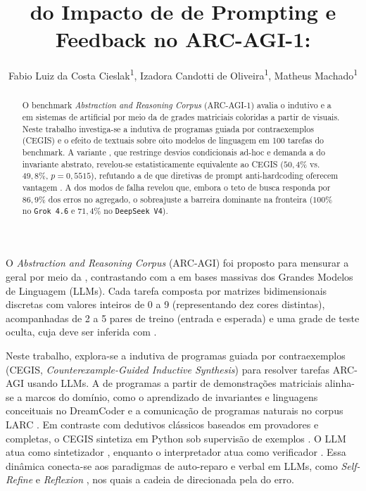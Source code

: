 \documentclass[letterpaper]{article} %
\title{\Analise{} do Impacto de \Variacoes{} de Prompting e Feedback \Semantico{} no ARC-AGI-1: \Fundamentacao{} \Estatistica{}}
\author{
    Fabio Luiz da Costa Cieslak\equalcontrib\textsuperscript{1},
    Izadora Candotti de Oliveira\equalcontrib\textsuperscript{1},
    Matheus Machado\equalcontrib\textsuperscript{1}
}
\begin{document}
\maketitle

\begin{abstract}
O benchmark \textit{Abstraction and Reasoning Corpus} (ARC-AGI-1) avalia o \raciocinio{} indutivo e a \generalizacao{} em sistemas de \inteligencia{} artificial por meio da \transformacao{} de grades matriciais coloridas a partir de \demonstracoes{} visuais. Neste trabalho investiga-se a \sintese{} indutiva de programas guiada por contraexemplos (CEGIS) e o efeito de \restricoes{} textuais \AntiTrapaca{} sobre oito modelos de linguagem em 100 tarefas do benchmark. A variante \AntiTrapaca{}, que restringe desvios condicionais ad-hoc e demanda a \declaracao{} \previa{} do invariante abstrato, revelou-se estatisticamente equivalente ao CEGIS \padrao{} ($50{,}4\%$ vs.\ $49{,}8\%$, $p = 0{,}5515$), refutando a \hipotese{} de que diretivas de prompt anti-hardcoding oferecem vantagem \generalizavel{}. A \analise{} dos modos de falha revelou que, embora o teto de busca responda por $86{,}9\%$ dos erros no agregado, o sobreajuste \espurio{} \e{} a barreira dominante na fronteira ($100\%$ no \texttt{Grok 4.6} e $71{,}4\%$ no \texttt{DeepSeek V4}).
\end{abstract}

\section{\Introducao{}}
O \textit{Abstraction and Reasoning Corpus} (ARC-AGI) \cite{chollet2019measure} foi proposto para mensurar a \inteligencia{} geral por meio da \inducao{}, contrastando com a \memorizacao{} em bases massivas \caracteristica{} dos Grandes Modelos de Linguagem (LLMs). Cada tarefa \e{} composta por matrizes bidimensionais discretas com valores inteiros de 0 a 9 (representando dez cores distintas), acompanhadas de 2 a 5 pares de treino (entrada e \saida{} esperada) e uma grade de teste oculta, cuja \transformacao{} deve ser inferida com \exatidao{}.

Neste trabalho, explora-se a \sintese{} indutiva de programas guiada por contraexemplos (CEGIS, \textit{Counterexample-Guided Inductive Synthesis}) \cite{solar2008program} para resolver tarefas ARC-AGI usando LLMs. A \inducao{} de programas a partir de demonstra{\c{c}}{\~o}es matriciais alinha-se a marcos do dom{\'{i}}nio, como o aprendizado de invariantes e linguagens conceituais no DreamCoder \cite{ellis2021dreamcoder} e a comunica{\c{c}}{\~a}o de programas naturais no corpus LARC \cite{larc2022acquaviva}. Em contraste com \metodos{} dedutivos cl{\'{a}}ssicos baseados em provadores \logicos{} e \especificacoes{} completas, o CEGIS sintetiza \funcoes{} em Python sob supervis{\~a}o de exemplos \empiricos{}. O LLM atua como sintetizador \probabilistico{}, enquanto o interpretador atua como verificador \deterministico{}. Essa din{\^{a}}mica conecta-se aos paradigmas de auto-reparo e  verbal em LLMs, como \textit{Self-Refine} \cite{madaan2023self} e \textit{Reflexion} \cite{shinn2023reflexion}, nos quais a cadeia de \raciocinio{} \cite{wei2022chain} \e{} direcionada pela \evidencia{} do erro.
\end{document}
